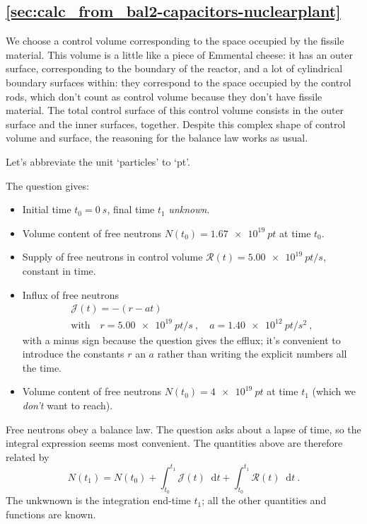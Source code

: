 \documentclass[a4paper,12pt,%
onecolumn,oneside,%
british%
]{memoir}
\newcommand{\solution}[1]{\subsection*{\makebox[0pt][r]{\faIcon[regular]{lightbulb}\enskip}\ref{#1}}%
\addcontentsline{toc}{subsection}{\ref{#1}}%
\label{#1_sol}%
\marginpar{\vspace{-1\baselineskip}\hspace{-8em}\footnotesize Exercise p.~\pageref{#1}}
}%
\newcommand*{\di}{\mathop{}\!\mathrm{d}}%
\renewcommand*{\|}[1][]{\nonscript\:#1\vert\nonscript\:\mathopen{}}
\newcommand*{\yti}{t_{0}}
\newcommand*{\ytf}{t_{1}}
\newcommand*{\dt}{\di t}
\newcommand*{\yN}{N}
\newcommand*{\yJ}{\mathcal{J}}
\newcommand*{\yR}{\mathcal{R}}
\begin{document}
\solution{sec:calc_from_bal2-capacitors-nuclearplant}
We choose a control volume corresponding to the space occupied by the fissile material. This volume is a little like a piece of Emmental cheese: it has an outer surface, corresponding to the boundary of the reactor, and a lot of  cylindrical boundary surfaces within: they correspond to the space occupied by the control rods, which don't count as control volume because they don't have fissile material. The total control surface of this control volume consists in the outer surface and the inner surfaces, together. Despite this complex shape of control volume and surface, the reasoning for the balance law works as usual.

  Let's abbreviate the unit \enquote*{particles} to \enquote*{pt}.

  The question gives:
  \begin{itemize}[nosep]
  \item Initial time $\yti=\qty{0}{s}$, final time $\ytf$ \emph{unknown}.
  \item Volume content of free neutrons $\yN(\yti)=\qty{1.67e19}{pt}$ at time $\yti$.
  \item Supply of free neutrons in control volume $\yR(t) = \qty{5.00e19}{pt/s}$, constant in time.
  \item Influx of free neutrons
    \begin{equation*}
      \begin{gathered}
     \yJ(t) = -(r - a t)
     \\
     \text{with}\quad
     r= \qty{5.00e19}{pt/s} \ ,\quad
     a = \qty{1.40e12}{pt/s^{2}} \ ,
      \end{gathered}
    \end{equation*}
with a minus sign because the question gives the efflux; it's convenient to introduce the constants $r$ an $a$ rather than writing the explicit numbers all the time.
\item   Volume content of free neutrons $\yN(\yti)=\qty{4e19}{pt}$ at time $\ytf$ (which we \emph{don't} want to reach).
  \end{itemize}

  Free neutrons obey a balance law. The question asks about a lapse of time, so the integral expression seems most convenient. The quantities above are therefore related by
  \begin{equation*}
    \yN(\ytf) = \yN(\yti) + \int_{\yti}^{\ytf}\!\!\yJ(t)\dt
    + \int_{\yti}^{\ytf}\!\!\yR(t)\dt \ .
  \end{equation*}
  The unkwnown is the integration end-time $\ytf$; all the other quantities and functions are known.
\end{document}
